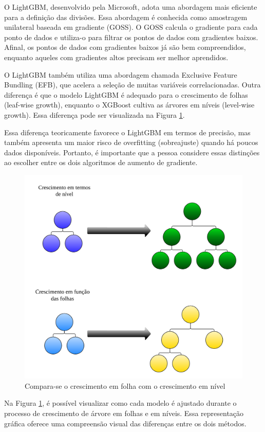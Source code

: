 O LightGBM, desenvolvido pela Microsoft, adota uma abordagem mais eficiente para a definição das divisões. Essa abordagem é conhecida como amostragem unilateral baseada em gradiente (GOSS). O GOSS calcula o gradiente para cada ponto de dados e utiliza-o para filtrar os pontos de dados com gradientes baixos. Afinal, os pontos de dados com gradientes baixos já são bem compreendidos, enquanto aqueles com gradientes altos precisam ser melhor aprendidos.

O LightGBM também utiliza uma abordagem chamada Exclusive Feature Bundling (EFB), que acelera a seleção de muitas variáveis correlacionadas. Outra diferença é que o modelo LightGBM é adequado para o crescimento de folhas (leaf-wise growth), enquanto o XGBoost cultiva as árvores em níveis (level-wise growth). Essa diferença pode ser visualizada na Figura \ref{fig:xgboost}.

Essa diferença teoricamente favorece o LightGBM em termos de precisão, mas também apresenta um maior risco de overfitting (sobreajuste) quando há poucos dados disponíveis. Portanto, é importante que a pessoa considere essas distinções ao escolher entre os dois algoritmos de aumento de gradiente.

\begin{figure}[!htb]
	\centering
	\caption{Compara-se o crescimento em folha com o crescimento em nível}
	\label{fig:xgboost}
	\includegraphics[width=0.7\linewidth]{Modelos/Figuras/xgboost}
	
\end{figure}


Na Figura \ref{fig:xgboost}, é possível visualizar como cada modelo é ajustado durante o processo de crescimento de árvore em folhas e em níveis. Essa representação gráfica oferece uma compreensão visual das diferenças entre os dois métodos.

